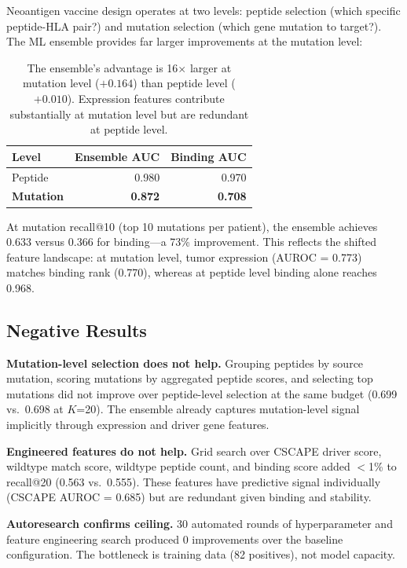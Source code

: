 \documentclass[11pt,twocolumn]{article}
\begin{document}
Neoantigen vaccine design operates at two levels: peptide selection (which specific peptide-HLA pair?) and mutation selection (which gene mutation to target?). The ML ensemble provides far larger improvements at the mutation level:

\begin{table}[ht]
\centering
\footnotesize
\begin{tabular}{@{}lrr@{}}
\toprule
Level & Ensemble AUC & Binding AUC \\
\midrule
Peptide & 0.980 & 0.970 \\
\textbf{Mutation} & \textbf{0.872} & \textbf{0.708} \\
\bottomrule
\end{tabular}
\caption{The ensemble's advantage is 16$\times$ larger at mutation level ($+0.164$) than peptide level ($+0.010$). Expression features contribute substantially at mutation level but are redundant at peptide level.}
\end{table}

At mutation recall@10 (top 10 mutations per patient), the ensemble achieves 0.633 versus 0.366 for binding---a 73\% improvement. This reflects the shifted feature landscape: at mutation level, tumor expression (AUROC = 0.773) matches binding rank (0.770), whereas at peptide level binding alone reaches 0.968.

\subsection{Negative Results}

\textbf{Mutation-level selection does not help.} Grouping peptides by source mutation, scoring mutations by aggregated peptide scores, and selecting top mutations did not improve over peptide-level selection at the same budget (0.699 vs.\ 0.698 at $K$=20). The ensemble already captures mutation-level signal implicitly through expression and driver gene features.

\textbf{Engineered features do not help.} Grid search over CSCAPE driver score, wildtype match score, wildtype peptide count, and binding score added $<$1\% to recall@20 (0.563 vs.\ 0.555). These features have predictive signal individually (CSCAPE AUROC = 0.685) but are redundant given binding and stability.

\textbf{Autoresearch confirms ceiling.} 30 automated rounds of hyperparameter and feature engineering search produced 0 improvements over the baseline configuration. The bottleneck is training data (82 positives), not model capacity.
\end{document}
